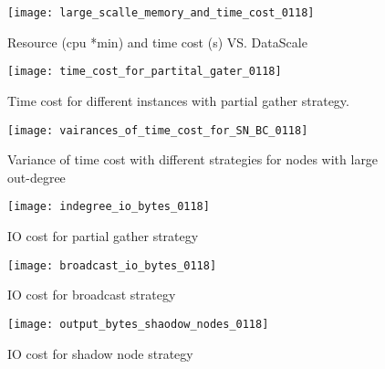 \documentclass[conference]{IEEEtran}
\begin{document}
\begin{figure*}[htbp]
\centering
\begin{minipage}{0.3\linewidth}
\centering
\texttt{[image: large\_scalle\_memory\_and\_time\_cost\_0118]}
\caption{Resource (cpu *min) and time cost (s) VS. DataScale}
\label{fig:scalability}
\end{minipage}
\hfill
\begin{minipage}{0.3\linewidth}
\centering
\texttt{[image: time\_cost\_for\_partital\_gater\_0118]}
 \caption{Time cost for different instances with partial gather strategy.}
\label{fig:paritial}
\end{minipage}
\hfill
\begin{minipage}{0.3\linewidth}
\centering
\texttt{[image: vairances\_of\_time\_cost\_for\_SN\_BC\_0118]}
 \caption{Variance of time cost with different strategies for nodes with large out-degree}
\label{fig:out_degree_strategies}
\end{minipage}
\end{figure*}



\begin{figure*}[htbp]
\centering
\begin{minipage}{0.3\linewidth}
\centering
\texttt{[image: indegree\_io\_bytes\_0118]}
\caption{IO cost for partial gather strategy}
\label{fig:in_degree_io_bytes}
\end{minipage}
\hfill
\begin{minipage}{0.3\linewidth}
\centering
\texttt{[image: broadcast\_io\_bytes\_0118]}
 \caption{IO cost for broadcast strategy } %
\label{fig:out_degree_io_bytes}
\end{minipage}
\hfill
\begin{minipage}{0.3\linewidth}
\centering
\texttt{[image: output\_bytes\_shaodow\_nodes\_0118]}
 \caption{IO cost for shadow node strategy } %
\label{fig:out_degree_io_bytes_SN}
\end{minipage}
\end{figure*}
\end{document}
